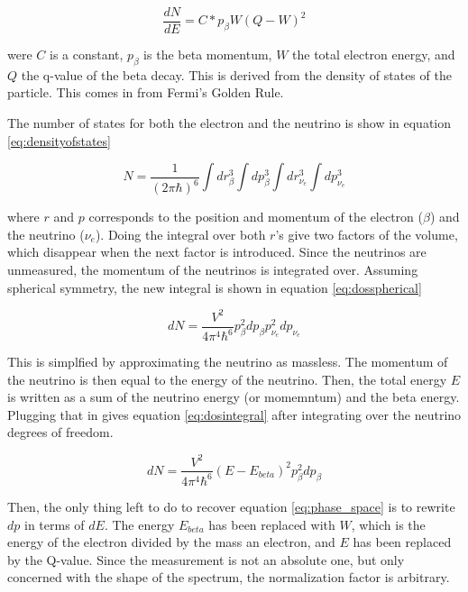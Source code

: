 \begin{equation}
	\frac{dN}{dE} = C * p_{\beta}W(Q - W)^{2}
	\label{eq:phase_space}
\end{equation}

were $C$ is a constant, $p_{\beta}$ is the beta momentum, $W$ the total electron energy, and $Q$ the q-value of the beta decay.
This is derived from the density of states of the particle.
This comes in from Fermi's Golden Rule.

The number of states for both the electron and the neutrino is show in equation \ref{eq:densityofstates}

\begin{equation}
	N = \frac{1}{(2\pi\hbar)^{6}}\int dr^{3}_{\beta} \int dp^{3}_{\beta}\int dr^{3}_{\nu_{e}} \int dp^{3}_{\nu_{e}} 
	\label{eq:densityofstates}
\end{equation}

where $r$ and $p$ corresponds to the position and momentum of the electron ($\beta$) and the neutrino ($\nu_{e}$).
Doing the integral over both $r$'s give two factors of the volume, which disappear when the next factor is introduced.
Since the neutrinos are unmeasured, the momentum of the neutrinos is integrated over. 
Assuming spherical symmetry, the new integral is shown in equation \ref{eq:dosspherical}

\begin{equation}
	dN = \frac{V^{2}}{4\pi^{4}\hbar^{6}}p_{\beta}^{2}dp_{\beta}p_{\nu_{e}}^{2}dp_{\nu_{e}}
	\label{eq:dosspherical}
\end{equation}

This is simplfied by approximating the neutrino as massless.
The momentum of the neutrino is then equal to the energy of the neutrino.
Then, the total energy $E$ is written as a sum of the neutrino energy (or momemntum) and the beta energy.
Plugging that in gives equation \ref{eq:dosintegral} after integrating over the neutrino degrees of freedom. 

\begin{equation}
	dN = \frac{V^{2}}{4\pi^{4}\hbar^{6}}(E - E_{beta})^{2}p_{\beta}^{2}dp_{\beta}
	\label{eq:dosintegral}
\end{equation}

Then, the only thing left to do to recover equation \ref{eq:phase_space} is to rewrite $dp$ in terms of $dE$. 
The energy $E_{beta}$ has been replaced with $W$, which is the energy of the electron divided by the mass an electron, and $E$ has been replaced by the Q-value.
Since the measurement is not an absolute one, but only concerned with the shape of the spectrum, the normalization factor is arbitrary.

